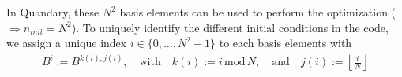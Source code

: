 \documentclass[11pt]{article}
\newcommand{\R}{\mathds{R}}
\begin{document}
In Quandary, these $N^2$ basis elements can be used to perform the optimization ($\Rightarrow n_{init}=N^2$). To uniquely identify the different initial conditions in the code, we assign a
unique index $i \in \{0,\dots, N^2-1\}$ to each basis elements with 
\begin{align*}
  B^i := B^{k(i), j(i)}, \quad \text{with} \quad k(i) := i \,\mbox{mod}\, N,
  \quad \text{and} \quad j(i) := \left\lfloor \frac{i}{N} \right\rfloor
\end{align*}



\end{document}
